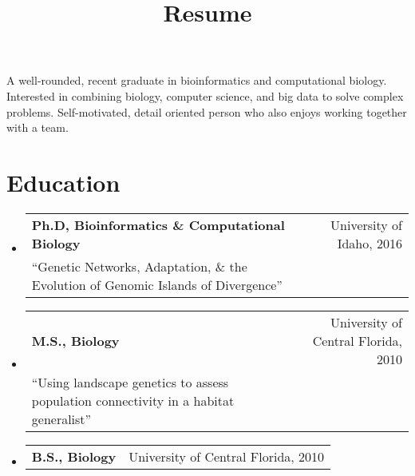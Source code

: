 \documentclass[11pt,letterpaper,sans]{moderncv}        %
\title{Resume }                               %
\begin{document}
\makecvtitle

\small{A well-rounded, recent graduate in bioinformatics and computational biology. Interested in combining biology, computer science, and big data to solve complex problems. Self-motivated, detail oriented person who also enjoys working together with a team.}

\section{Education}




\begin{itemize}
\item{
\centering
  \begin{tabular}{p{14.4cm}r}
\textbf{Ph.D, Bioinformatics \& Computational Biology} & University of Idaho, 2016\\
``Genetic Networks, Adaptation, \& the Evolution of Genomic Islands of Divergence'' & \\
  \end{tabular}
}

\item{
\centering
  \begin{tabular}{p{13cm}r}
\textbf{M.S., Biology} & University of Central Florida, 2010\\
``Using landscape genetics to assess population connectivity in a habitat generalist'' & \\
  \end{tabular}
}

\item{
\centering
  \begin{tabular}{p{13cm}r}
\textbf{B.S., Biology} & University of Central Florida, 2010\\
  \end{tabular}
}

\end{itemize}
\end{document}
